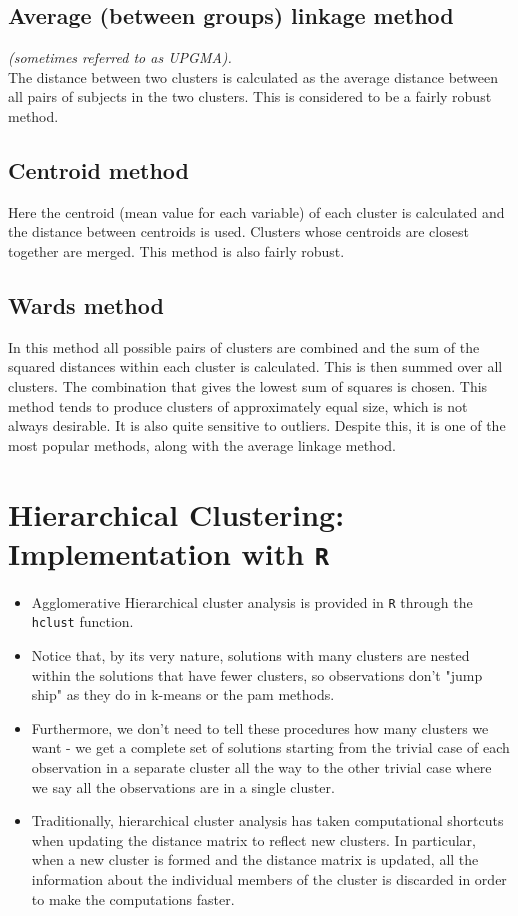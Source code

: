 \documentclass[RCluster.tex]{subfiles}
\begin{document}
\subsection{Average (between groups) linkage method }
\textit{(sometimes referred to as UPGMA).}\\
The distance between two clusters is calculated as the average distance between all pairs
of subjects in the two clusters. This is considered to be a fairly robust method.

\subsection{Centroid method}
Here the centroid (mean value for each variable) of each cluster is calculated and the
distance between centroids is used. Clusters whose centroids are closest together are
merged. This method is also fairly robust.

\subsection{Wards method}
In this method all possible pairs of clusters are combined and the sum of the squared
distances within each cluster is calculated. This is then summed over all clusters. The
combination that gives the lowest sum of squares is chosen. This method tends to
produce clusters of approximately equal size, which is not always desirable. It is also
quite sensitive to outliers. Despite this, it is one of the most popular methods, along
with the average linkage method.

\section{Hierarchical Clustering: Implementation with \texttt{R}}
\begin{itemize}
\item Agglomerative Hierarchical cluster analysis is provided in \texttt{R} through the \texttt{hclust} function.
\item Notice that, by its very nature, solutions with many clusters are nested within the solutions that have fewer clusters, so observations don't "jump ship" as they do in k-means or the pam methods. 
\item Furthermore, we don't need to tell these procedures how many clusters we want - we get a complete set of solutions starting from the trivial case of each observation in a separate cluster all the way to the other trivial case where we say all the observations are in a single cluster.
\item Traditionally, hierarchical cluster analysis has taken computational shortcuts when updating the distance matrix to reflect new clusters. In particular, when a new cluster is formed and the distance matrix is updated, all the information about the individual members of the cluster is discarded in order to make the computations faster. 
\end{itemize}
\end{document}
